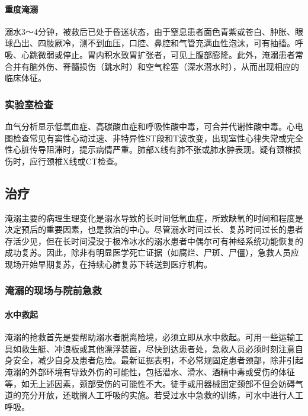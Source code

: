 \paragraph{重度淹溺}

溺水3～4分钟，被救后已处于昏迷状态，由于窒息患者面色青紫或苍白、肿胀、眼球凸出、四肢厥冷，测不到血压，口腔、鼻腔和气管充满血性泡沫，可有抽搐。呼吸、心跳微弱或停止。胃内积水致胃扩张者，可见上腹部膨隆。此外，淹溺患者常合并有脑外伤、脊髓损伤（跳水时）和空气栓塞（深水潜水时），从而出现相应的临床体征。

\subsubsection{实验室检查}

血气分析显示低氧血症、高碳酸血症和呼吸性酸中毒，可合并代谢性酸中毒。心电图检查常见有窦性心动过速、非特异性ST段和T波改变，出现室性心律失常或完全性心脏传导阻滞时，提示病情严重。肺部X线有肺不张或肺水肿表现。疑有颈椎损伤时，应行颈椎X线或CT检查。

\subsection{治疗}

淹溺主要的病理生理变化是溺水导致的长时间低氧血症，所致缺氧的时间和程度是决定预后的重要因素，也是救治的中心。尽管溺水时间过长、复苏时间过长的患者存活少见，但在长时间浸没于极冷冰水的溺水患者中偶尔可有神经系统功能恢复的成功复苏。因此，除非有明显医学死亡证据（如腐烂、尸斑、尸僵），急救人员应现场开始早期复苏，在持续心肺复苏下转送到医疗机构。

\subsubsection{淹溺的现场与院前急救}

\paragraph{水中救起}

淹溺的抢救首先是要帮助溺水者脱离险境，必须立即从水中救起。可用一些运输工具如救生艇、冲浪板或其他漂浮装置，尽快到达患者处，急救人员必须时刻注意自身安全，减少自身及患者危险。最新证据表明，不必常规固定患者颈部，除非引起淹溺的外部环境有导致外伤的可能性，包括潜水、滑水、酒精中毒或受伤的体征等，如无上述因素，颈部受伤的可能性不大。徒手或用器械固定颈部不但会妨碍气道的充分开放，还耽搁人工呼吸的实施。若受过水中急救的训练，可水中进行人工呼吸。

